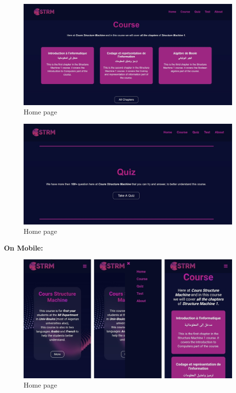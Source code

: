 \begin{figure}[ht]
	\centering
	\label{}\includegraphics[scale=0.5]{img/1.jpg}                
	\caption{Home page} 
	\label{fig:Homepage2}
\end{figure} 
\begin{figure}[ht]
	\centering
	\label{}\includegraphics[scale=0.5]{img/2.jpg}                
	\caption{Home page} 
	\label{fig:Homepage3}
\end{figure} 
\textbf{On Mobile:}
\begin{figure}[ht]
	\centering
	\label{}\includegraphics[scale=0.249]{img/00000.jpg}                
	\caption{Home page} 
	\label{fig:Homepage4}
\end{figure}

